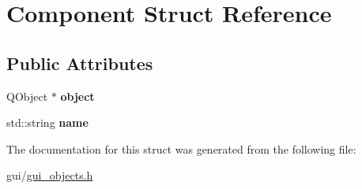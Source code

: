 \hypertarget{struct_component}{}\section{Component Struct Reference}
\label{struct_component}
\subsection*{Public Attributes}
\begin{DoxyCompactItemize}
\item 
\hypertarget{struct_component_aa0cd0fd532b68947f1d6f6f50ca76700}{}\label{struct_component_aa0cd0fd532b68947f1d6f6f50ca76700} 
Q\+Object $\ast$ {\bfseries object}
\item 
\hypertarget{struct_component_a46343549452bda5ee9752f7a9bc15efb}{}\label{struct_component_a46343549452bda5ee9752f7a9bc15efb} 
std\+::string {\bfseries name}
\end{DoxyCompactItemize}


The documentation for this struct was generated from the following file\+:\begin{DoxyCompactItemize}
\item 
gui/\hyperlink{gui__objects_8h}{gui\+\_\+objects.\+h}\end{DoxyCompactItemize}
